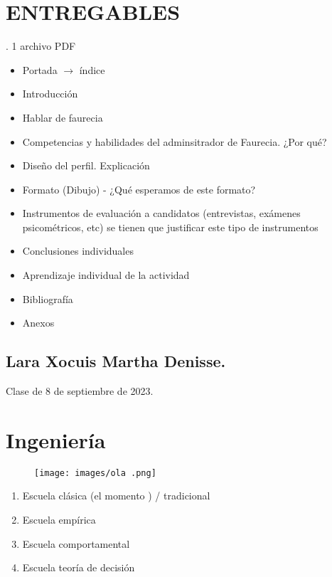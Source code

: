 \documentclass[letterpaper,12pt]{article}
\begin{document}
\begin{sloppypar}
\section*{ENTREGABLES}. 1 archivo PDF 
\begin{itemize}
    \item Portada $\longrightarrow$ índice 
    \item Introducción
    \item Hablar de faurecia
    \item Competencias y habilidades del adminsitrador de Faurecia. ¿Por qué? 
    \item Diseño del perfil. Explicación
    \item Formato (Dibujo) - ¿Qué esperamos de este formato? 
    \item Instrumentos de evaluación a candidatos (entrevistas, exámenes psicométricos, etc) se tienen que justificar este tipo de instrumentos
    \item Conclusiones individuales
    \item Aprendizaje individual de la actividad
    \item Bibliografía 
    \item Anexos
\end{itemize}
\newpage
\subsection*{Lara Xocuis Martha Denisse.}
Clase de 8 de septiembre de 2023.
\section{Ingeniería}
\begin{figure}[H]
    \centering
    \texttt{[image: images/ola .png]}
\end{figure}


\begin{enumerate}
    \item Escuela clásica (el momento ) / tradicional 
    
    \item Escuela empírica
    
    \item Escuela comportamental 
    
    \item Escuela teoría de decisión 
    

\end{enumerate}
\end{sloppypar}
\end{document}
